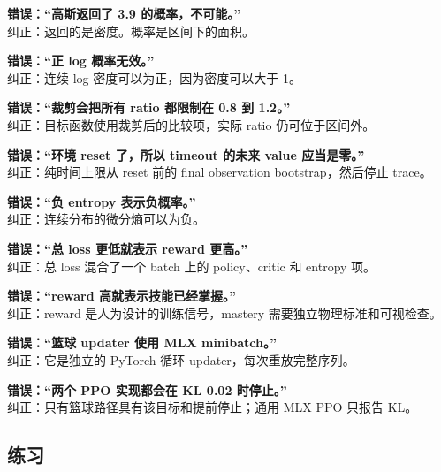 \documentclass[
  chinese,
  11pt,
  letterpaper,
]{article}
\begin{document}
\textbf{错误：``高斯返回了 3.9 的概率，不可能。''}\\
纠正：返回的是密度。概率是区间下的面积。

\textbf{错误：``正 log 概率无效。''}\\
纠正：连续 log 密度可以为正，因为密度可以大于 1。

\textbf{错误：``裁剪会把所有 ratio 都限制在 0.8 到 1.2。''}\\
纠正：目标函数使用裁剪后的比较项，实际 ratio 仍可位于区间外。

\textbf{错误：``环境 reset 了，所以 timeout 的未来 value 应当是零。''}\\
纠正：纯时间上限从 reset 前的 final observation bootstrap，然后停止
trace。

\textbf{错误：``负 entropy 表示负概率。''}\\
纠正：连续分布的微分熵可以为负。

\textbf{错误：``总 loss 更低就表示 reward 更高。''}\\
纠正：总 loss 混合了一个 batch 上的 policy、critic 和 entropy 项。

\textbf{错误：``reward 高就表示技能已经掌握。''}\\
纠正：reward 是人为设计的训练信号，mastery 需要独立物理标准和可视检查。

\textbf{错误：``篮球 updater 使用 MLX minibatch。''}\\
纠正：它是独立的 PyTorch 循环 updater，每次重放完整序列。

\textbf{错误：``两个 PPO 实现都会在 KL 0.02 时停止。''}\\
纠正：只有篮球路径具有该目标和提前停止；通用 MLX PPO 只报告 KL。

\subsection{练习}\label{ux7ec3ux4e60}
\end{document}
